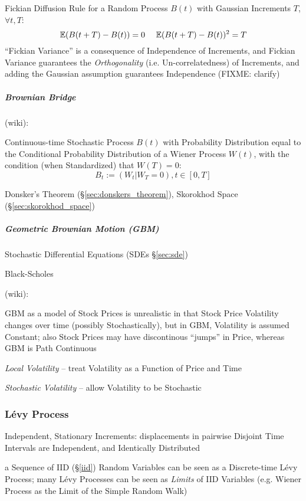 Fickian Diffusion Rule for a Random Process $B(t)$ with Gaussian Increments $T$,
$\forall t, T$:
\[
  \expect(B(t+T) - B(t)) = 0 \ \ \ \ \expect(B(t+T) - B(t))^2 = T
\]
``Fickian Variance'' is a consequence of Independence of Increments, and Fickian
Variance guarantees the \emph{Orthogonality} (i.e. Un-correlatedness) of
Increments, and adding the Gaussian assumption guarantees Independence (FIXME:
clarify)



\subparagraph{Brownian Bridge}\label{sec:brownian_bridge}\hfill

(wiki):

Continuous-time Stochastic Process $B(t)$ with Probability Distribution equal to
the Conditional Probability Distribution of a Wiener Process $W(t)$, with the
condition (when Standardized) that $W(T) = 0$:
\[
  B_t := (W_t | W_T = 0), t \in [0,T]
\]

\fist Donsker's Theorem (\S\ref{sec:donskers_theorem}), Skorokhod Space
(\S\ref{sec:skorokhod_space})



\subparagraph{Geometric Brownian Motion (GBM)}\label{sec:gbm}\hfill

Stochastic Differential Equations (SDEs \S\ref{sec:sde})

Black-Scholes

(wiki):

GBM as a model of Stock Prices is unrealistic in that Stock Price Volatility
changes over time (possibly Stochastically), but in GBM, Volatility is assumed
Constant; also Stock Prices may have discontinous ``jumps'' in Price, whereas
GBM is Path Continuous

\emph{Local Volatility} -- treat Volatility as a Function of Price and Time

\emph{Stochastic Volatility} -- allow Volatility to be Stochastic



\subsubsection{L\'evy Process}\label{sec:levy_process}

Independent, Stationary Increments: displacements in pairwise Disjoint Time
Intervals are Independent, and Identically Distributed

\fist a Sequence of IID (\S\ref{iid}) Random Variables can be seen as a
Discrete-time L\'evy Process; many L\'evy Processes can be seen as \emph{Limits}
of IID Variables (e.g. Wiener Process as the Limit of the Simple Random Walk)

